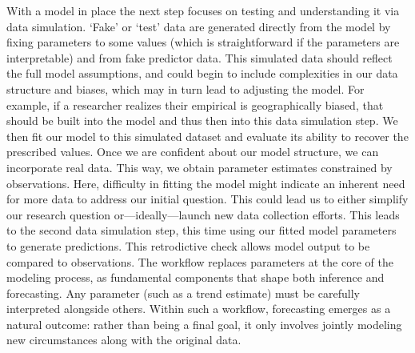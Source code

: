 \documentclass[11pt]{article}
\begin{document}
With a model in place the next step focuses on testing and understanding it via data simulation. `Fake' or `test' data are generated directly from the model by fixing parameters to some values (which is straightforward if the parameters are interpretable) and from fake predictor data. This simulated data should reflect the full model assumptions, and could begin to include complexities in our data structure and biases, which may in turn lead to adjusting the model. For example, if a researcher realizes their empirical is geographically biased, that should be built into the model and thus then into this data simulation step. 
We then fit our model to this simulated dataset and evaluate its ability to recover the prescribed values. 
Once we are confident about our model structure, we can incorporate real data. This way, we obtain parameter estimates constrained by observations. Here, difficulty in fitting the model might indicate an inherent need for more data to address our initial question. This could lead us to either simplify our research question or---ideally---launch new data collection efforts. This leads to the second data simulation step, this time using our fitted model parameters to generate predictions. This retrodictive check allows model output to be compared to observations. 
The workflow replaces parameters at the core of the modeling process, as fundamental components that shape both inference and forecasting. Any parameter (such as a trend estimate) must be carefully interpreted alongside others. %
Within such a workflow, forecasting emerges as a natural outcome: rather than being a final goal, it only involves jointly modeling new circumstances along with the original data.
\end{document}
